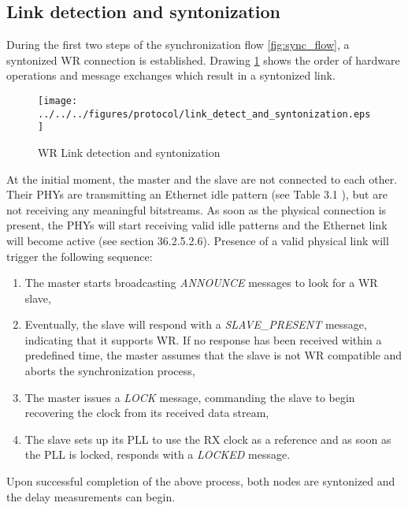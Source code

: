 \subsection{Link detection and syntonization}
During the first two steps of the synchronization flow
\ref{fig:sync_flow}, a syntonized WR connection is established. Drawing
\ref{fig:link_detect_and_syntonization} shows the order of hardware operations
and message exchanges which result in a syntonized link.
\begin{figure}[ht!]
  \centering
  \texttt{[image: ../../../figures/protocol/link\_detect\_and\_syntonization.eps]}
  \caption{WR Link detection and syntonization}
  \label{fig:link_detect_and_syntonization}
\end{figure}
At the initial moment, the master and the slave are not connected to
each other. Their PHYs are transmitting an Ethernet idle pattern (see Table 3.1 \cite{tomekMSC}), 
but are not receiving any meaningful bitstreams. As soon
as the physical connection is present, the PHYs will start receiving valid
idle patterns and the Ethernet link will become active (see \cite{IEEE802.3}
section 36.2.5.2.6). Presence of a valid physical link will trigger the
following sequence:
\begin{enumerate}
\item The master starts broadcasting \textit{ANNOUNCE} messages to look for
a WR slave,
\item Eventually, the slave will respond with a \textit{SLAVE\_PRESENT}
message, indicating that it supports WR. If no response has been received
within a predefined time, the master assumes that the slave is not WR
compatible and aborts the synchronization process,
\item The master issues a \textit{LOCK} message, commanding the slave to
begin recovering the clock from its received data stream,
\item The slave sets up its PLL to use the RX clock as a reference and as
soon as the PLL is locked, responds with a \textit{LOCKED} message.
\end{enumerate}
Upon successful completion of the above process, both nodes are syntonized
and the delay measurements can begin.

